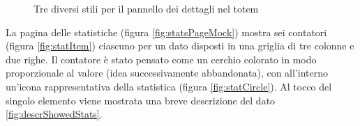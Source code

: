 \begin{figure}
    \centering
    \caption{Tre diversi stili per il pannello dei dettagli nel totem}
    \label{fig:detailBanner}
\end{figure}

La pagina delle statistiche (figura \ref{fig:statsPageMock}) mostra sei contatori (figura \ref{fig:statItem}) ciascuno per un dato disposti in una griglia di tre colonne e due righe. Il contatore è stato pensato come un cerchio colorato in modo proporzionale al valore (idea successivamente abbandonata), con all'interno un'icona rappresentativa della statistica (figura \ref{fig:statCircle}). Al tocco del singolo elemento viene mostrata una breve descrizione del dato \ref{fig:descrShowedStats}.

